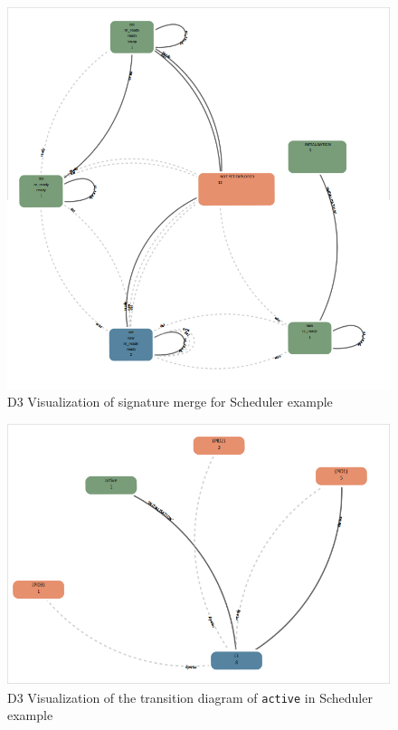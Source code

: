 \begin{figure}[h!]
\centering
\includegraphics[width=14cm]{bilder/sigmerge.png}
\caption{D3 Visualization of signature merge for Scheduler example}
\label{sigmerge}
\end{figure}

\begin{figure}[h!]
\centering
\includegraphics[width=14cm]{bilder/transdiag-wo.png}
\caption{D3 Visualization of the transition diagram of \texttt{active} in Scheduler example}
\label{transdiag}
\end{figure}

